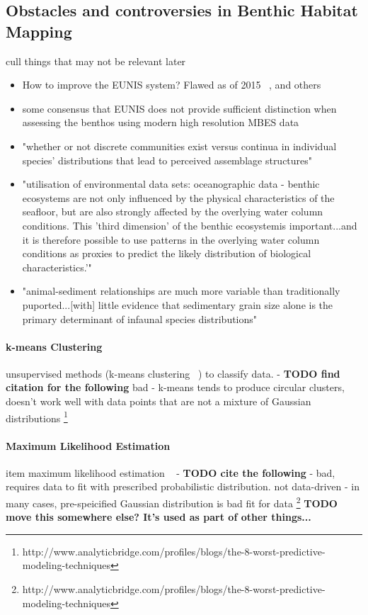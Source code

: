  \subsection {Obstacles and controversies in Benthic Habitat Mapping}
 cull things that may not be relevant later
 \begin{itemize}
     \item How to improve the EUNIS system? Flawed as of 2015 ~\citep*{calvert15}, and others
     \item some consensus that EUNIS does not provide sufficient distinction when assessing the benthos using modern high resolution MBES data ~\citep*{calvert15}
     \item "whether or not discrete communities exist versus continua in individual species' distributions that lead to perceived assemblage structures" ~\citep*{cjbrown11}
     \item "utilisation of environmental data sets: oceanographic data - benthic ecosystems are not only influenced by the physical characteristics of the seafloor, but are also strongly affected by the overlying water column conditions. This 'third dimension' of the benthic ecosystemis important...and it is therefore possible to use patterns in the overlying water column conditions as proxies to predict the likely distribution of biological characteristics.'" ~\citep*{cjbrown11}
     \item "animal-sediment relationships are much more variable than traditionally puported...[with] little evidence that sedimentary grain size alone is the primary determinant of infaunal species distributions" ~\citep*{snelgrove94}
 \end{itemize}


            \paragraph{k-means Clustering}
            unsupervised methods (k-means clustering ~\citep*{henriques14}) to classify data. - \textbf{TODO find citation for the following} bad - k-means tends to produce circular clusters, doesn't work well with data points that are not a mixture of Gaussian distributions \footnote{http://www.analyticbridge.com/profiles/blogs/the-8-worst-predictive-modeling-techniques}

            \paragraph{Maximum Likelihood Estimation}
            item maximum likelihood estimation ~\citep*{micallef12} - \textbf{TODO cite the following} - bad, requires data to fit with prescribed probabilistic distribution. not data-driven  - in many cases, pre-speicified Gaussian distribution is bad fit for data \footnote{http://www.analyticbridge.com/profiles/blogs/the-8-worst-predictive-modeling-techniques} \textbf{TODO move this somewhere else? It's used as part of other things...}

